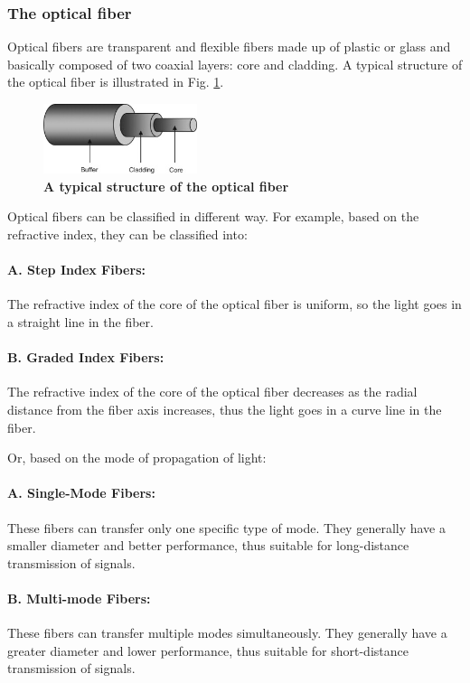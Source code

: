 \documentclass[10pt,a4paper,twocolumn,twoside,UTF8]{article}
\begin{document}
		\subsubsection{The optical fiber}
		Optical fibers are transparent and flexible fibers made up of plastic or glass and basically composed of two coaxial layers: core and cladding. 
		A typical structure of the optical fiber is illustrated in Fig. \ref{fig.illus-1.1}. 
		\begin{figure}[htbp]
			\centering
			\includegraphics[width=0.4\textwidth]{attachments/illus-1.1.png}
			\caption{\textbf{A typical structure of the optical fiber}}
			\label{fig.illus-1.1}
		\end{figure}
		
		Optical fibers can be classified in different way. 
		For example, based on the refractive index, they can be classified into:
		\paragraph{A. Step Index Fibers:} The refractive index of the core of the optical fiber is uniform, so the light goes in a straight line in the fiber.
		\paragraph{B. Graded Index Fibers:} The refractive index of the core of the optical fiber decreases as the radial distance from the fiber axis increases, thus the light goes in a curve line in the fiber.
		
		Or, based on the mode of propagation of light:
		\paragraph{A. Single-Mode Fibers:} These fibers can transfer only one specific type of mode. They generally have a smaller diameter and better performance, thus suitable for long-distance transmission of signals.
		\paragraph{B. Multi-mode Fibers:} These fibers can transfer multiple modes simultaneously. They generally have a greater diameter and lower  performance, thus suitable for short-distance transmission of signals.
\end{document}

